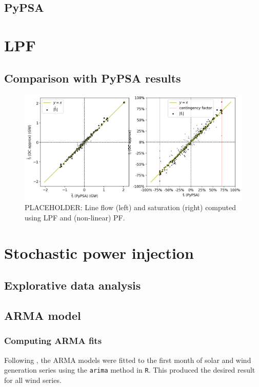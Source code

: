 \documentclass[main.tex]{subfiles}
\begin{document}
\subsection{PyPSA}
\section{LPF}
\subsection{Comparison with PyPSA results}
\begin{figure}
    \centering
    \includegraphics[width=\textwidth]{img/lineflowcorr.png}
    \caption{PLACEHOLDER: Line flow (left) and saturation (right) computed using LPF and (non-linear) PF.}
    \label{fig:generationtech}
\end{figure}
\section{Stochastic power injection}
\subsection{Explorative data analysis}
\subsection{ARMA model}

\subsubsection{Computing ARMA fits}\label{arimamod}
Following \cite{Nesti2018emergentfailures}, the ARMA models were fitted to the first month of solar and wind generation series using the \texttt{arima} method in \texttt{R}. This produced the desired result for all wind series.
\end{document}
